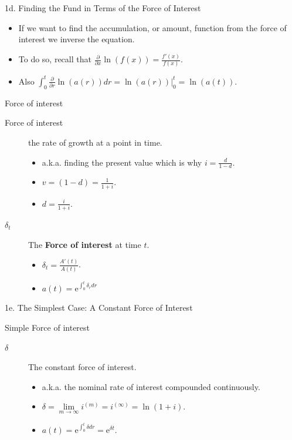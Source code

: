 \begin{CHPT_SUMM_AUTO}[label = {L.-1d}]{1d. Finding the Fund in Terms of the Force of Interest}
	\begin{itemize}[leftmargin = *]
		\item	If we want to find the accumulation, or amount, function from the force of interest we inverse the equation.
		\item	To do so, recall that $\frac{\partial}{\partial x}\ln(f(x)) = \frac{f'(x)}{f(x)}$.
		\item	Also $\int_{0}^{t} \frac{\partial}{\partial r} \ln(a(r)) dr = 	\ln(a(r))\big|_{0}^{t} =	\ln(a(t))$.
	\end{itemize}
	
\begin{FORMULA_SUMM}{Force of interest}
\begin{description}
	\item[Force of interest]	the rate of growth at a point in time.
		\begin{itemize}[leftmargin = *]
		\item	a.k.a. finding the present value which is why $i = \frac{d}{1 - d}$.
		\item	$v = (1 - d) = \frac{1}{1 + i}$.
		\item	$d = \frac{i}{1 + i}$.
		\end{itemize}
	\item[$\delta_{t}$]	The \textbf{Force of interest} at time $t$.
		\begin{itemize}[leftmargin = *]
		\item	$\delta_{t} = \frac{A'(t)}{A(t)}$.
		\item	$a(t)	=	\textrm{e}^{\int_{0}^{t}\delta_{r}dr}$
		\end{itemize}
\end{description}
\end{FORMULA_SUMM}
\end{CHPT_SUMM_AUTO}

\begin{CHPT_SUMM_AUTO}[label = {L.-1e}]{1e. The Simplest Case: A Constant Force of Interest}

\begin{FORMULA_SUMM}{Simple Force of interest}
\begin{description}
	\item[$\delta$]	The constant force of interest.
		\begin{itemize}[leftmargin = *]
		\item	a.k.a. the nominal rate of interest compounded continuously.
		\item	$\delta = \underset{m \rightarrow \infty}{\lim} i^{(m)} = i^{(\infty)} = \ln(1 + i)$.
		\item	$a(t)	=	\textrm{e}^{\int_{0}^{t}\delta dr}	=	\textrm{e}^{\delta t}$.
		\end{itemize}
\end{description}
\end{FORMULA_SUMM}
\end{CHPT_SUMM_AUTO}

